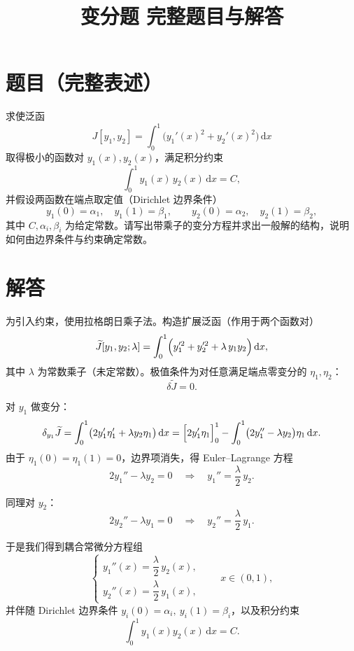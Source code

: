 \documentclass[11pt]{article}
\title{变分题 完整题目与解答}
\author{}
\date{}
\begin{document}
\maketitle

\section*{题目（完整表述）}
求使泛函
\[
J[y_1,y_2]=\int_{0}^{1}\bigl(y_1'(x)^2 + y_2'(x)^2\bigr)\,\mathrm{d}x
\]
取得极小的函数对 \(y_1(x),y_2(x)\)，满足积分约束
\[
\int_{0}^{1} y_1(x)\,y_2(x)\,\mathrm{d}x = C,
\]
并假设两函数在端点取定值（Dirichlet 边界条件）
\[
y_1(0)=\alpha_1,\quad y_1(1)=\beta_1,\qquad y_2(0)=\alpha_2,\quad y_2(1)=\beta_2,
\]
其中 \(C,\alpha_i,\beta_i\) 为给定常数。请写出带乘子的变分方程并求出一般解的结构，说明如何由边界条件与约束确定常数。

\vspace{1ex}

\section*{解答}
为引入约束，使用拉格朗日乘子法。构造扩展泛函（作用于两个函数对）
\[
\widetilde{J}[y_1,y_2;\lambda]=\int_0^1\Bigl( y_1'^2 + y_2'^2 + \lambda\,y_1 y_2\Bigr)\,\mathrm{d}x,
\]
其中 \(\lambda\) 为常数乘子（未定常数）。极值条件为对任意满足端点零变分的 \(\eta_1,\eta_2\)：
\[
\delta \widetilde J=0.
\]

对 \(y_1\) 做变分：
\[
\delta_{y_1}\widetilde J = \int_0^1\bigl(2y_1'\eta_1' + \lambda y_2 \eta_1\bigr)\,\mathrm{d}x
= \Bigl[2y_1'\eta_1\Bigr]_0^1 - \int_0^1\bigl(2y_1'' - \lambda y_2\bigr)\eta_1\,\mathrm{d}x.
\]
由于 \(\eta_1(0)=\eta_1(1)=0\)，边界项消失，得 Euler--Lagrange 方程
\[
2y_1'' - \lambda y_2 = 0 \quad\Longrightarrow\quad y_1'' = \frac{\lambda}{2}\,y_2.
\]

同理对 \(y_2\)：
\[
2y_2'' - \lambda y_1 =0 \quad\Longrightarrow\quad y_2'' = \frac{\lambda}{2}\,y_1.
\]

于是我们得到耦合常微分方程组
\begin{equation}\label{eq:coupled}
\begin{cases}
y_1''(x) = \dfrac{\lambda}{2}\,y_2(x),\\[6pt]
y_2''(x) = \dfrac{\lambda}{2}\,y_1(x),
\end{cases}
\qquad x\in(0,1),
\end{equation}
并伴随 Dirichlet 边界条件 \(y_i(0)=\alpha_i,\ y_i(1)=\beta_i\)，以及积分约束
\[
\int_0^1 y_1(x)y_2(x)\,\mathrm{d}x = C.
\]
\end{document}
